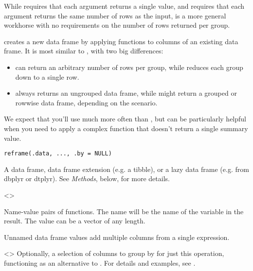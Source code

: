 \documentclass[a4paper]{book}
\begin{document}
\begin{Description}
\strong{[Experimental]}

While  requires that each argument returns a single value, and
 requires that each argument returns the same number of rows as the
input,  is a more general workhorse with no requirements on the
number of rows returned per group.

 creates a new data frame by applying functions to columns of an
existing data frame. It is most similar to , with two big
differences:
\begin{itemize}

\item{}  can return an arbitrary number of rows per group, while
 reduces each group down to a single row.
\item{}  always returns an ungrouped data frame, while 
might return a grouped or rowwise data frame, depending on the scenario.

\end{itemize}


We expect that you'll use  much more often than , but
 can be particularly helpful when you need to apply a complex
function that doesn't return a single summary value.
\end{Description}
%
\begin{Usage}
\begin{verbatim}
reframe(.data, ..., .by = NULL)
\end{verbatim}
\end{Usage}
%
\begin{Arguments}
\begin{ldescription}
\item[\code{.data}] A data frame, data frame extension (e.g. a tibble), or a
lazy data frame (e.g. from dbplyr or dtplyr). See \emph{Methods}, below, for
more details.

\item[\code{...}] <>

Name-value pairs of functions. The name will be the name of the variable in
the result. The value can be a vector of any length.

Unnamed data frame values add multiple columns from a single expression.

\item[\code{.by}] \strong{[Experimental]}

<> Optionally, a selection of columns to
group by for just this operation, functioning as an alternative to . For
details and examples, see .
\end{ldescription}
\end{Arguments}
\end{document}
